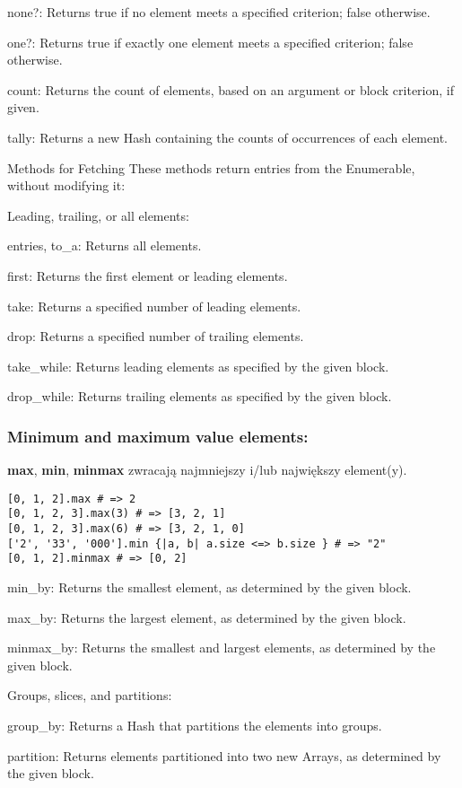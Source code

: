 none?: Returns true if no element meets a specified criterion; false otherwise.

one?: Returns true if exactly one element meets a specified criterion; false otherwise.

count: Returns the count of elements, based on an argument or block criterion, if given.

tally: Returns a new Hash containing the counts of occurrences of each element.

Methods for Fetching
These methods return entries from the Enumerable, without modifying it:

Leading, trailing, or all elements:

entries, to\_a: Returns all elements.

first: Returns the first element or leading elements.

take: Returns a specified number of leading elements.

drop: Returns a specified number of trailing elements.

take\_while: Returns leading elements as specified by the given block.

drop\_while: Returns trailing elements as specified by the given block.

\subsubsection{Minimum and maximum value elements:
}
\textbf{max}, \textbf{min}, \textbf{minmax} zwracają najmniejszy i/lub największy element(y).
\begin{verbatim}
[0, 1, 2].max # => 2
[0, 1, 2, 3].max(3) # => [3, 2, 1]
[0, 1, 2, 3].max(6) # => [3, 2, 1, 0]
['2', '33', '000'].min {|a, b| a.size <=> b.size } # => "2"
[0, 1, 2].minmax # => [0, 2]
\end{verbatim}

min\_by: Returns the smallest element, as determined by the given block.

max\_by: Returns the largest element, as determined by the given block.

minmax\_by: Returns the smallest and largest elements, as determined by the given block.

Groups, slices, and partitions:

group\_by: Returns a Hash that partitions the elements into groups.

partition: Returns elements partitioned into two new Arrays, as determined by the given block.


